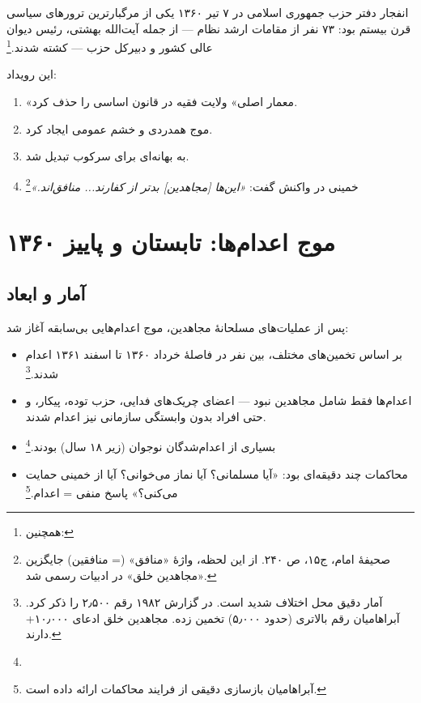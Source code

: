 \begin{warningBox}
انفجار دفتر حزب جمهوری اسلامی در ۷ تیر ۱۳۶۰ یکی از مرگبارترین ترورهای سیاسی قرن بیستم بود: ۷۳ نفر از مقامات ارشد نظام — از جمله آیت‌الله بهشتی، رئیس دیوان عالی کشور و دبیرکل حزب — کشته شدند.\footnote{ همچنین: }

این رویداد:
\begin{enumerate}[label=\textcolor{cAccent}{\bfseries\arabic*.}, rightmargin=2em]
    \item «معمار اصلی» ولایت فقیه در قانون اساسی را حذف کرد.
    \item موج همدردی و خشم عمومی ایجاد کرد.
    \item به بهانه‌ای برای سرکوب  تبدیل شد.
    \item خمینی در واکنش گفت: \textit{«این‌ها [مجاهدین] بدتر از کفارند... منافق‌اند.»}\footnote{صحیفهٔ امام، ج۱۵، ص ۲۴۰. از این لحظه، واژهٔ «منافق» (= منافقین) جایگزین «مجاهدین خلق» در ادبیات رسمی شد.}
\end{enumerate}
\end{warningBox}

\section{موج اعدام‌ها: تابستان و پاییز ۱۳۶۰}

\subsection{آمار و ابعاد}

پس از عملیات‌های مسلحانهٔ مجاهدین، موج اعدام‌هایی بی‌سابقه آغاز شد:

\begin{itemize}[label=\textcolor{cAccent}{$\blacktriangleright$}, rightmargin=2em]
    \item بر اساس تخمین‌های مختلف، بین  نفر در فاصلهٔ خرداد ۱۳۶۰ تا اسفند ۱۳۶۱ اعدام شدند.\footnote{آمار دقیق محل اختلاف شدید است.  در گزارش ۱۹۸۲ رقم ۲٫۵۰۰ را ذکر کرد. آبراهامیان رقم بالاتری (حدود ۵٫۰۰۰) تخمین زده. مجاهدین خلق ادعای ۱۰٫۰۰۰+ دارند. }
    \item اعدام‌ها فقط شامل مجاهدین نبود — اعضای چریک‌های فدایی، حزب توده، پیکار، و حتی افراد بدون وابستگی سازمانی نیز اعدام شدند.
    \item بسیاری از اعدام‌شدگان نوجوان (زیر ۱۸ سال) بودند.\footnote{}
    \item محاکمات چند دقیقه‌ای بود: «آیا مسلمانی؟ آیا نماز می‌خوانی؟ آیا از خمینی حمایت می‌کنی؟» پاسخ منفی = اعدام.\footnote{ آبراهامیان بازسازی دقیقی از فرایند محاکمات ارائه داده است.}
\end{itemize}

